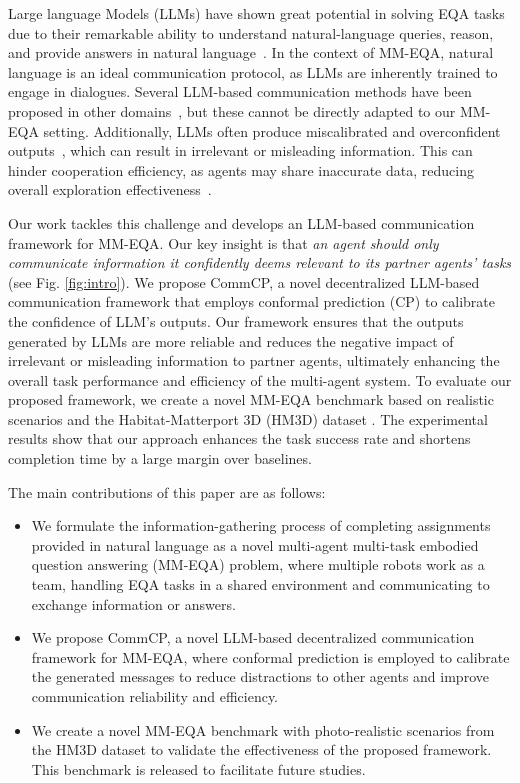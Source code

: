 Large language Models (LLMs) have shown great potential in solving EQA tasks due to their remarkable ability to understand natural-language queries, reason, and provide answers in natural language~\cite{zhang2023building}. 
In the context of MM-EQA, natural language is an ideal communication protocol, as LLMs are inherently trained to engage in dialogues. Several LLM-based communication methods have been proposed in other domains~\cite{zhang2024towards,rasal2024llm}, but these cannot be directly adapted to our MM-EQA setting. 
Additionally, LLMs often produce miscalibrated and overconfident outputs~\cite{ mielke2022reducingconversationalagentsoverconfidence}, which can result in irrelevant or misleading information. 
This can hinder cooperation efficiency, as agents may share inaccurate data, reducing overall exploration effectiveness~\cite{hao2024quantifying}.

Our work tackles this challenge and develops an LLM-based communication framework for MM-EQA. Our key insight is that \emph{an agent should only communicate information it confidently deems relevant to its partner agents' tasks} (see Fig. \ref{fig:intro}).
We propose CommCP, a novel decentralized LLM-based communication framework that employs conformal prediction (CP) \cite{shafer2008tutorial,ren2023robots} to calibrate the confidence of LLM's outputs. 
Our framework ensures that the outputs generated by LLMs are more reliable and reduces the negative impact of irrelevant or misleading information to partner agents, ultimately enhancing the overall task performance and efficiency of the multi-agent system.
To evaluate our proposed framework, we create a novel MM-EQA benchmark based on realistic scenarios and the Habitat-Matterport 3D (HM3D) dataset \cite{ramakrishnan2021habitat}.
The experimental results show that our approach enhances the task success rate and shortens completion time by a large margin over baselines.

The main contributions of this paper are as follows:
\begin{itemize}
    \item We formulate the information-gathering process of completing assignments provided in natural language as a novel multi-agent multi-task embodied question answering (MM-EQA) problem, where multiple robots work as a team, handling EQA tasks in a shared environment and communicating to exchange information or answers.
    \item We propose CommCP, a novel LLM-based decentralized communication framework for MM-EQA, where conformal prediction is employed to calibrate the generated messages to reduce distractions to other agents and improve communication reliability and efficiency. 
    \item We create a novel MM-EQA benchmark with photo-realistic scenarios from the HM3D dataset to validate the effectiveness of the proposed framework. This benchmark is released to facilitate future studies.
\end{itemize}